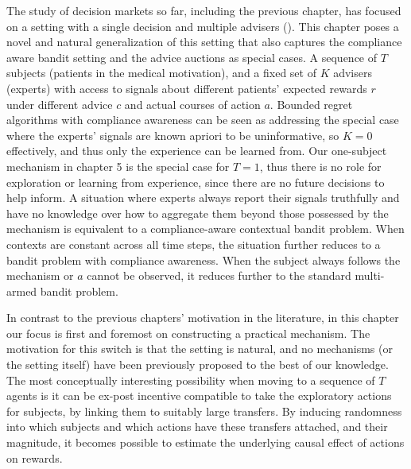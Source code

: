 The study of decision markets so far, including the previous chapter, has focused on a setting with a single decision and multiple advisers (\cite{hanson2002decision,othman2010decision,chen2014eliciting}).
This chapter poses a novel and natural generalization of this setting that also captures the compliance aware bandit setting and the advice auctions as special cases. 
A sequence of $T$ subjects (patients in the medical motivation), and a fixed set of $K$ advisers (experts) with access to signals about different patients' expected rewards $r$ under different advice $c$ and actual courses of action $a$. 
Bounded regret algorithms with compliance awareness can be seen as addressing the special case where the experts' signals are known apriori to be uninformative, so $K=0$ effectively, and thus only the experience can be learned from.
Our one-subject mechanism in chapter 5 is the special case for $T={1}$, thus there is no role for exploration or learning from experience, since there are no future decisions to help inform.
A situation where experts always report their signals truthfully and have no knowledge over how to aggregate them beyond those possessed by the mechanism is equivalent to a compliance-aware contextual bandit problem. 
When contexts are constant across all time steps, the situation further reduces to a bandit problem with compliance awareness.
When the subject always follows the mechanism or $a$ cannot be observed, it reduces further  to the standard multi-armed bandit problem. 


In contrast to the previous chapters' motivation in the literature, in this chapter our focus is first and foremost on constructing a practical mechanism. 
The motivation for this switch is that the setting is natural, and no mechanisms (or the setting itself) have been previously proposed to the best of our knowledge.
The most conceptually interesting possibility when moving to a sequence of $T$ agents is it can be ex-post incentive compatible to take the exploratory actions for subjects, by linking them to suitably large transfers. By inducing randomness into which subjects and which actions have these transfers attached, and their magnitude, it becomes possible to estimate the underlying causal effect of actions on rewards. 


